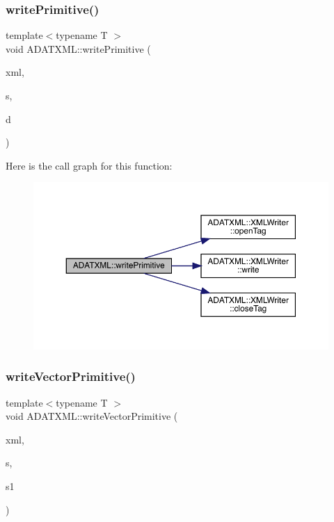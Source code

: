 \subsubsection{\texorpdfstring{writePrimitive()}{writePrimitive()}}
{\footnotesize\ttfamily template$<$typename T $>$ \\
void A\+D\+A\+T\+X\+M\+L\+::write\+Primitive (\begin{DoxyParamCaption}\item[{\mbox{\hyperlink{classADATXML_1_1XMLWriter}{X\+M\+L\+Writer}} \&}]{xml,  }\item[{const string \&}]{s,  }\item[{const T \&}]{d }\end{DoxyParamCaption})}

Here is the call graph for this function\+:\nopagebreak
\begin{figure}[H]
\begin{center}
\leavevmode
\includegraphics[width=350pt]{d7/da0/namespaceADATXML_ac21baf6aebab16f5e0425a455d5868a6_cgraph}
\end{center}
\end{figure}
\mbox{\label{namespaceADATXML_ac69d6dbd4a4a3ca366df448dfc85c9d2}} 
\subsubsection{\texorpdfstring{writeVectorPrimitive()}{writeVectorPrimitive()}}
{\footnotesize\ttfamily template$<$typename T $>$ \\
void A\+D\+A\+T\+X\+M\+L\+::write\+Vector\+Primitive (\begin{DoxyParamCaption}\item[{\mbox{\hyperlink{classADATXML_1_1XMLWriter}{X\+M\+L\+Writer}} \&}]{xml,  }\item[{const std\+::string \&}]{s,  }\item[{const std\+::vector$<$ T $>$ \&}]{s1 }\end{DoxyParamCaption})}

